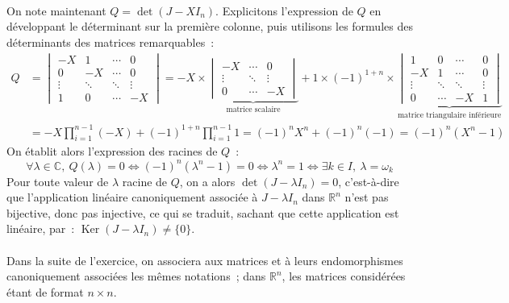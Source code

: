 \documentclass{article}
\DeclareMathOperator{\Ker}{Ker}
\begin{document}
  \paragraph{} On note maintenant $Q = \det(J - XI_n)$. Explicitons l'expression de $Q$ en développant le déterminant sur la première colonne, puis utilisons les formules des déterminants des matrices remarquables~:
  \begin{align*}
    Q &= \begin{vmatrix}
      -X & 1 & \cdots & 0 \\
      0 & -X & \cdots & 0 \\
      \vdots  & \ddots  & \ddots & \vdots  \\
      1 & 0 & \cdots & -X
    \end{vmatrix} = -X \times
    \underbrace{\begin{vmatrix}
       -X & \cdots & 0 \\
      \vdots  & \ddots  & \vdots  \\
       0 & \cdots & -X
    \end{vmatrix}}_{\text{matrice scalaire}} + 1 \times (-1)^{1+n} \times
    \underbrace{\begin{vmatrix}
      1 & 0 & \cdots & 0 \\
      -X & 1 & \cdots & 0 \\
      \vdots  & \ddots  & \ddots & \vdots  \\
      0 & \cdots & -X & 1
    \end{vmatrix}}_{\text{matrice triangulaire inférieure}} \\
    &= -X \prod_{i=1}^{n-1} (-X) + (-1)^{1+n} \prod_{i=1}^{n-1}1 = (-1)^n X^n + (-1)^n(-1) = (-1)^n(X^n - 1)
  \end{align*}
  On établit alors l'expression des racines de $Q$~:
  \[
    \forall \lambda\in\mathbb{C},\: Q(\lambda) = 0 \iff (-1)^n(\lambda^n - 1) = 0 \iff \lambda^n = 1 \iff \exists k\in I,\: \lambda = \omega_k
  \]
  Pour toute valeur de $\lambda$ racine de $Q$, on a alors $\det(J - \lambda I_n) = 0$, c'est-à-dire que l'application linéaire canoniquement associée à $J - \lambda I_n$ dans $\mathbb{R}^n$ n'est pas bijective, donc pas injective, ce qui se traduit, sachant que cette application est linéaire, par~: $\Ker(J - \lambda I_n) \neq \{0\}$.

  \paragraph{} Dans la suite de l'exercice, on associera aux matrices et à leurs endomorphismes canoniquement associées les mêmes notations~; dans $\mathbb{R}^n$, les matrices considérées étant de format $n \times n$.
\end{document}

